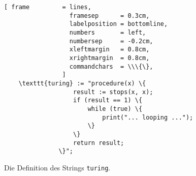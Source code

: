 \begin{figure}[!h]
  \centering
\begin{Verbatim}[ frame         = lines, 
                  framesep      = 0.3cm, 
                  labelposition = bottomline,
                  numbers       = left,
                  numbersep     = -0.2cm,
                  xleftmargin   = 0.8cm,
                  xrightmargin  = 0.8cm,
                  commandchars  = \\\{\},
                ]
    \texttt{turing} := "procedure(x) \{
                   result := stops(x, x);
                   if (result == 1) \{
                       while (true) \{
                           print("... looping ...");
                       \}
                   \}
                   return result;
               \}";
\end{Verbatim}
  \vspace*{-0.3cm}
  \caption{Die Definition des Strings \texttt{turing}.}
  \label{fig:turing-string}
\end{figure}

